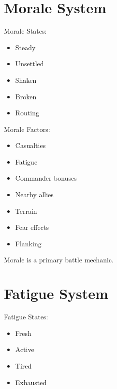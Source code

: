 \documentclass[11pt,a4paper]{article}
\begin{document}
\section{Morale System}

Morale States:

\begin{itemize}

    \item Steady

    \item Unsettled

    \item Shaken

    \item Broken

    \item Routing

\end{itemize}

Morale Factors:

\begin{itemize}

    \item Casualties

    \item Fatigue

    \item Commander bonuses

    \item Nearby allies

    \item Terrain

    \item Fear effects

    \item Flanking

\end{itemize}

Morale is a primary battle mechanic.

\section{Fatigue System}

Fatigue States:

\begin{itemize}

    \item Fresh

    \item Active

    \item Tired

    \item Exhausted

\end{itemize}
\end{document}
